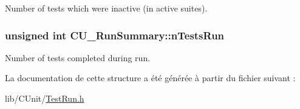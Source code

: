 Number of tests which were inactive (in active suites). 

\hypertarget{structCU__RunSummary_a15da425a520dfb2628febc5313c92aa7}{
\subsubsection[{n\-Tests\-Run}]{\setlength{\rightskip}{0pt plus 5cm}unsigned int C\-U\-\_\-\-Run\-Summary\-::n\-Tests\-Run}}\label{structCU__RunSummary_a15da425a520dfb2628febc5313c92aa7}


Number of tests completed during run. 



La documentation de cette structure a été générée à partir du fichier suivant \-:\begin{DoxyCompactItemize}
\item 
lib/\-C\-Unit/\hyperlink{TestRun_8h}{Test\-Run.\-h}\end{DoxyCompactItemize}
